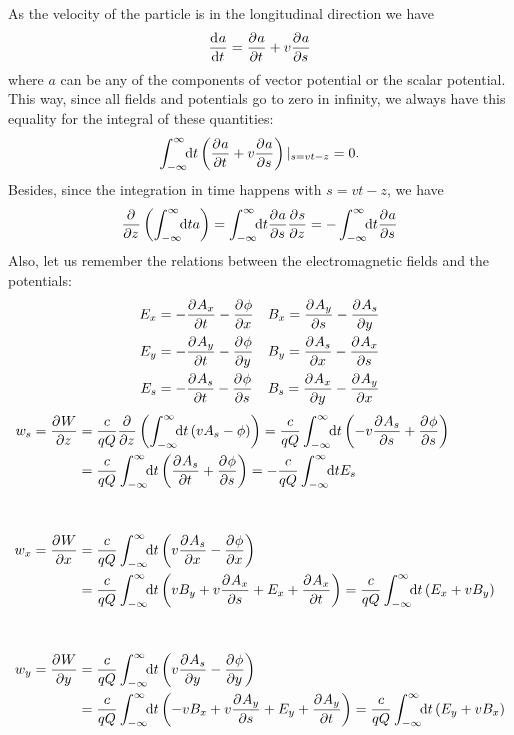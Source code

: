 \begin{apendicesenv}
    As the velocity of the particle is in the longitudinal direction we have
    \begin{align}
    	\frac{\mathrm{d}^{{}}a}{\mathrm{d} t^{{}}} = \frac{\partial^{{}}a}{\partial t^{{}}} + v\frac{\partial^{{}}a}{\partial s^{{}}}
    \end{align}
    where $a$ can be any of the components of vector potential or the scalar potential. This way, since all fields and potentials go to zero in infinity, we always have this equality for the integral of these quantities:
    \begin{align}
    	\int_{-\infty}^{\infty}\!\!\text{d}t \left(\frac{\partial^{{}}a}{\partial t^{{}}} + v\frac{\partial^{{}}a}{\partial s^{{}}}\right)|_{s=vt-z} = 0.
    \end{align}
    Besides, since the integration in time happens with $s=vt-z$, we have
    \begin{align}
    	\frac{\partial^{{}}}{\partial z^{{}}}\left(\int_{-\infty}^{\infty}\!\!\text{d}t a\right) =
    	\int_{-\infty}^{\infty}\!\!\text{d}t \frac{\partial^{{}}a}{\partial s^{{}}}\frac{\partial^{{}}s}{\partial z^{{}}} =
    	-\int_{-\infty}^{\infty}\!\!\text{d}t \frac{\partial^{{}}a}{\partial s^{{}}}
    \end{align}
    Also, let us remember the relations between the electromagnetic fields and the potentials:
    \begin{align}
    	E_x &= -\frac{\partial^{{}}A_x}{\partial t^{{}}} - \frac{\partial^{{}}\phi}{\partial x^{{}}} &
        	& B_x = \frac{\partial^{{}}A_y}{\partial s^{{}}} - \frac{\partial^{{}}A_s}{\partial y^{{}}}\\
    	E_y &= -\frac{\partial^{{}}A_y}{\partial t^{{}}} - \frac{\partial^{{}}\phi}{\partial y^{{}}} &
        	& B_y = \frac{\partial^{{}}A_s}{\partial x^{{}}} - \frac{\partial^{{}}A_x}{\partial s^{{}}}\\
    	E_s &= -\frac{\partial^{{}}A_s}{\partial t^{{}}} - \frac{\partial^{{}}\phi}{\partial s^{{}}} &
        	& B_s = \frac{\partial^{{}}A_x}{\partial y^{{}}} - \frac{\partial^{{}}A_y}{\partial x^{{}}}
    \end{align}
    \begin{align}
    	w_s = \derpar{W}{z}\nonumber
    	&= \frac{c}{qQ} \derpar{}{z}\left(\infint{t}{\left(vA_s-\phi\right)}\right)
    	= \frac{c}{qQ} \infint{t}{\left(-v\derpar{A_s}{s}+\derpar{\phi}{s}\right)}\\
    	&= \frac{c}{qQ} \infint{t}{\left(\derpar{A_s}{t}+\derpar{\phi}{s}\right)}
    	=-\frac{c}{qQ} \infint{t}{E_s}\\[1cm]
    	w_x = \derpar{W}{x}\nonumber
    	&=\frac{c}{qQ} \infint{t}{\left(v\derpar{A_s}{x}-\derpar{\phi}{x}\right)}\\
    	&= \frac{c}{qQ} \infint{t}{\left(vB_y+v\derpar{A_x}{s} + E_x + \derpar{A_x}{t}\right)}
    	= \frac{c}{qQ} \infint{t}{\left(E_x + vB_y\right)}\\[1cm]
    	w_y = \derpar{W}{y}\nonumber
    	&=\frac{c}{qQ} \infint{t}{\left(v\derpar{A_s}{y}-\derpar{\phi}{y}\right)}\\
    	&=\frac{c}{qQ} \infint{t}{\left(-vB_x+v\derpar{A_y}{s} + E_y + \derpar{A_y}{t}\right)}
    	= \frac{c}{qQ} \infint{t}{\left(E_y + vB_x\right)}
    \end{align}



\end{apendicesenv}
